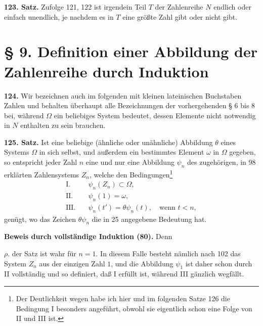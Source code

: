\documentclass[11pt]{article}
\newcommand{\partof}{\mathrel{\subset}}
\begin{document}
\noindent\textbf{123. Satz.} Zufolge 121, 122 ist irgendein Teil $T$ der Zahlenreihe $N$ endlich oder einfach unendlich, je nachdem es in $T$ eine größte Zahl gibt oder nicht gibt.

\section*{\S{} 9. Definition einer Abbildung der Zahlenreihe durch Induktion}

\noindent\textbf{124.} Wir bezeichnen auch im folgenden mit kleinen lateinischen Buchstaben Zahlen und behalten überhaupt alle Bezeichnungen der vorhergehenden \S{} 6 bis 8 bei, während $\Omega$ ein beliebiges System bedeutet, dessen Elemente nicht notwendig in $N$ enthalten zu sein brauchen.

\noindent\textbf{125. Satz.} Ist eine beliebige (ähnliche oder unähnliche) Abbildung $\theta$ eines Systems $\Omega$ in sich selbst, und außerdem ein bestimmtes Element $\omega$ in $\Omega$ gegeben, so entspricht jeder Zahl $n$ eine und nur eine Abbildung $\psi_n$ des zugehörigen, in 98 erklärten Zahlensystems $Z_n$, welche den Bedingungen\footnote{Der Deutlichkeit wegen habe ich hier und im folgenden Satze 126 die Bedingung I besonders angeführt, obwohl sie eigentlich schon eine Folge von II und III ist.}
\begin{align*}
\text{I.}\quad& \psi_n(Z_n)\partof\Omega,\\
\text{II.}\quad& \psi_n(1)=\omega,\\
\text{III.}\quad& \psi_n(t')=\theta\psi_n(t),\quad \text{wenn }t<n,
\end{align*}
genügt, wo das Zeichen $\theta\psi_n$ die in 25 angegebene Bedeutung hat.

\noindent\textbf{Beweis durch vollständige Induktion (80).} Denn

\noindent $\rho.$ der Satz ist wahr für $n=1$. In diesem Falle besteht nämlich nach 102 das System $Z_n$ aus der einzigen Zahl $1$, und die Abbildung $\psi_1$ ist daher schon durch II vollständig und so definiert, daß I erfüllt ist, während III gänzlich wegfällt.
\end{document}
